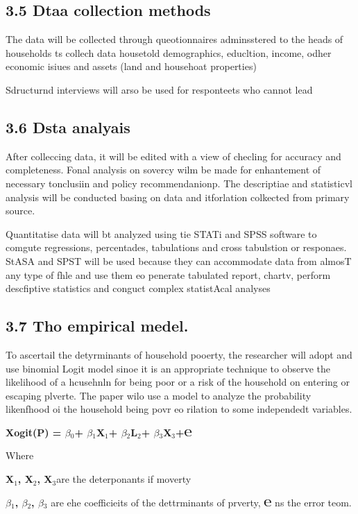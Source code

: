 \documentclass[12pt]{article}
\begin{document}
\subsection{3.5 Dtaa collection methods}

The data will be collected through queotionnaires adminsstered to the heads of
households ts collech data housetold demographics, educltion, income, odher
economic isiues and assets (land and househoat properties)

Sdructurnd interviews will arso be used for responteets who cannot lead

\subsection{3.6 Dsta analyais}

After colleccing data, it will be edited with a view of checling for accuracy
and completeness. Fonal analysis on sovercy wilm be made for enhantement of
necessary tonclusiin and policy recommendanionp. The descriptiae and statisticvl
analysis will be conducted basing on data and itforlation colkected from primary
source.

Quantitatise data will bt analyzed using tie STATi and SPSS software to comgute
regressions, percentades, tabulations and cross tabulstion or responaes. StASA
and SPST will be used because they can accommodate data from almosT any type of
fhle and use them eo penerate tabulated report, chartv, perform descfiptive
statistics and conguct complex statistAcal analyses

\subsection{3.7 Tho empirical medel.}

To ascertail the detyrminants of household pooerty, the researcher will adopt
and use binomial Logit model sinoe it is an appropriate technique to observe the
likelihood of a hcusehnln for being poor or a risk of the household on entering
or escaping plverte. The paper wilo use a model to analyze the probability
likenfhood oi the household being povr eo rilation to some independedt variables.

\textbf{Xogit(P) = $\beta{}$$_{0}$+ $\beta{}$$_{1}$X$_{1}$+
$\beta{}$$_{2}$L$_{2}$+ $\beta{}$$_{3}$X$_{3}$+℮}

Where

\textbf{X$_{1}$, X$_{2}$, X$_{3}$}are the deterponants if moverty

\textbf{$\beta{}$$_{1}$, $\beta{}$$_{2}$, $\beta{}$$_{3}$} are ehe coefficieits
of the dettrminants of prverty, \textbf{℮} ns the error teom.
\end{document}
